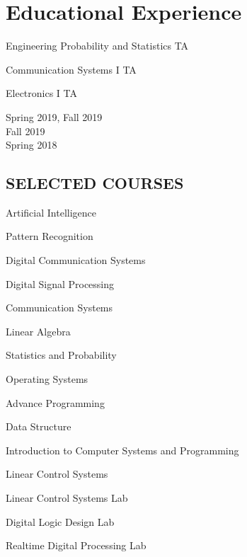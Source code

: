 \documentclass[11pt,a4paper,roman]{moderncv}        %
\begin{document}
{{{\section{Educational Experience}
\begin{itemize}
	\begin{minipage}[t]{0.5 \textwidth}
		\item Engineering Probability and Statistics TA
		\item Communication Systems I TA
		\item Electronics I TA
	\end{minipage}
	\begin{minipage}[t]{0.47 \textwidth}
		\begin{flushright}
			Spring 2019, Fall 2019\\
			Fall 2019\\
			Spring 2018\\


		\end{flushright}
		
	\end{minipage}

\end{itemize}



\subsection{SELECTED COURSES}
	\begin{itemize*}
		\item Artificial Intelligence
		\item Pattern Recognition
		\item Digital Communication Systems
		\item Digital Signal Processing
		\item Communication Systems 
		\item Linear Algebra
		\item Statistics and Probability
		\item Operating Systems
		\item Advance Programming
		\item Data Structure
		\item Introduction to Computer Systems and Programming
		\item Linear Control Systems
		\item Linear Control Systems Lab
		\item Digital Logic Design Lab
		\item Realtime Digital Processing Lab
	\end{itemize*}
}}}
\end{document}
